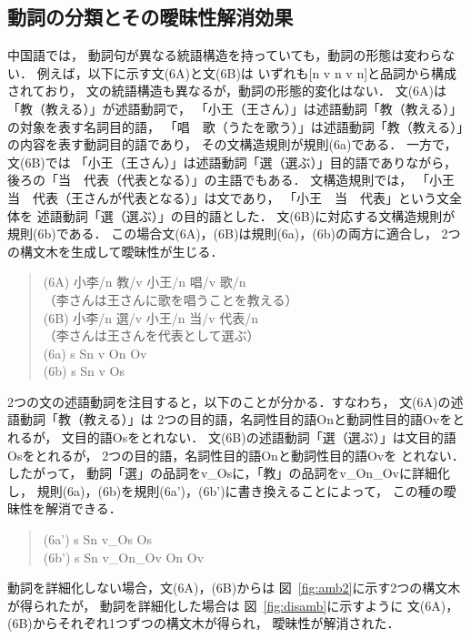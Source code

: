 \documentclass[japanese]{jnlp_1.3a}
\begin{document}
\subsection{動詞の分類とその曖昧性解消効果}
中国語では，
動詞句が異なる統語構造を持っていても，動詞の形態は変わらない．
例えば，以下に示す文(6A)と文(6B)は
いずれも[n v n v n]と品詞から構成されており，
文の統語構造も異なるが，動詞の形態的変化はない．
文(6A)は「教（教える）」が述語動詞で，
 「小王（王さん）」は述語動詞「教（教える）」の対象を表す名詞目的語，
 「唱　歌（うたを歌う）」は述語動詞「教（教える）」の内容を表す動詞目的語であり，
その文構造規則が規則(6a)である．
一方で，文(6B)では
 「小王（王さん）」は述語動詞「選（選ぶ）」目的語でありながら，
後ろの「当　代表（代表となる）」の主語でもある．
文構造規則では，
 「小王　当　代表（王さんが代表となる）」は文であり，
 「小王　当　代表」という文全体を
述語動詞「選（選ぶ）」の目的語とした．
文(6B)に対応する文構造規則が規則(6b)である．
この場合文(6A)，(6B)は規則(6a)，(6b)の両方に適合し，
2つの構文木を生成して曖昧性が生じる．
\begin{quotation}\noindent
\文(6A) 小李/n 教/v 小王/n 唱/v 歌/n\\
（李さんは王さんに歌を唱うことを教える）\\
\文(6B) 小李/n 選/v 小王/n 当/v 代表/n\\
（李さんは王さんを代表として選ぶ）\\
(6a) s \ya Sn v On Ov\\
(6b) s \ya Sn v Os\\
\end{quotation}

2つの文の述語動詞を注目すると，以下のことが分かる．すなわち，
文(6A)の述語動詞「教（教える）」は
2つの目的語，名詞性目的語Onと動詞性目的語Ovをとれるが，
文目的語Osをとれない．
文(6B)の述語動詞「選（選ぶ）」は文目的語Osをとれるが，
2つの目的語，名詞性目的語Onと動詞性目的語Ovを
とれない．
したがって，
動詞「選」の品詞をv\_Osに，「教」の品詞をv\_On\_Ovに詳細化し，
規則(6a)，(6b)を規則(6a')，(6b')に書き換えることによって，
この種の曖昧性を解消できる．
\begin{quotation}\noindent
{}(6a') s \ya Sn v\_Os Os\\
(6b') s \ya Sn v\_On\_Ov On Ov
\end{quotation}

動詞を詳細化しない場合，文(6A)，(6B)からは
図~\ref{fig:amb2}に示す2つの構文木が得られたが，
動詞を詳細化した場合は
図~\ref{fig:disamb}に示すように
文(6A)，(6B)からそれぞれ1つずつの構文木が得られ，
曖昧性が解消された．
\end{document}
